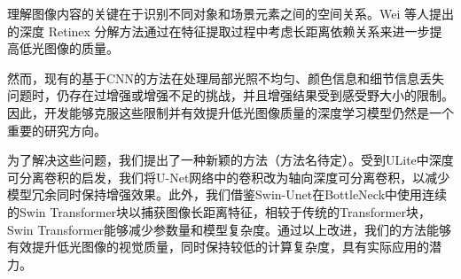 \documentclass[a4paper, 10pt]{article}
\begin{document}
		理解图像内容的关键在于识别不同对象和场景元素之间的空间关系。Wei 等人\cite{wei2018deep}提出的深度 Retinex 分解方法通过在特征提取过程中考虑长距离依赖关系来进一步提高低光图像的质量。
		
		然而，现有的基于CNN的方法在处理局部光照不均匀、颜色信息和细节信息丢失问题时，仍存在过增强或增强不足的挑战，并且增强结果受到感受野大小的限制。因此，开发能够克服这些限制并有效提升低光图像质量的深度学习模型仍然是一个重要的研究方向。
		
%		
%		
%		
%		


%		
		
		为了解决这些问题，我们提出了一种新颖的方法（方法名待定）。受到ULite\cite{dinh20231m}中深度可分离卷积的启发，我们将U-Net网络中的卷积改为轴向深度可分离卷积，以减少模型冗余同时保持增强效果。此外，我们借鉴Swin-Unet\cite{cao2022swin}在BottleNeck中使用连续的Swin Transformer块以捕获图像长距离特征，相较于传统的Transformer块，Swin Transformer能够减少参数量和模型复杂度。通过以上改进，我们的方法能够有效提升低光图像的视觉质量，同时保持较低的计算复杂度，具有实际应用的潜力。
		
\end{document}
